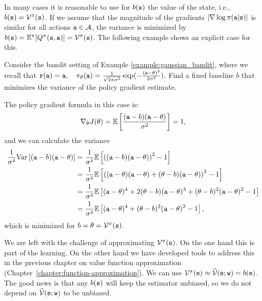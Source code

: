 In many cases it is reasonable to use for $b({\tt s})$ the value of the state,
i.e., $b({\tt s})=\mathcal{V}^\pi({\tt s})$. If we assume that the
magnitude of the gradients $|\nabla
\log \pi({\tt a}|{\tt s})|$ is similar for all actions
${\tt a}\in \mathcal{A}$, the variance is minimized 
by
$b({\tt s})=\mathbb{E}^\pi[Q^\pi({\tt s},{\tt a})]=\mathcal{V}^\pi({\tt s})$.
The following example shows an explicit case for this.
\begin{example}
    Consider the bandit setting of Example \ref{example:gaussian_bandit}, where we recall that
$        {\tt r}({\tt a}) = {\tt a}, \quad
        \pi_\theta({\tt a}) = \frac{1}{\sqrt{2 \pi \sigma^2}} \exp (- \frac{({\tt a} - \theta)^2}{2 \sigma^2}).$
Find a fixed baseline $b$ that minimizes the variance of the policy gradient estimate.

The policy gradient formula in this case is:
\begin{equation*}
        \nabla_\theta J(\theta) = \mathbb{E} \left[\frac{({\tt a}-b)({\tt a} - \theta)}{\sigma^2}\right] = 1, 
\end{equation*}
and we can calculate the variance
\begin{equation*}
\begin{split}
        \frac{1}{\sigma^4}\textrm{Var}\left[({\tt a}-b)({\tt a} - \theta)\right]  
        &=\frac{1}{\sigma^4}\mathbb{E}\left[\left(({\tt a}-b)({\tt a} - \theta)\right)^2 - 1\right] \\
        &=\frac{1}{\sigma^4}\mathbb{E}\left[\left(({\tt a}-\theta)({\tt a} - \theta) + (\theta-b)({\tt a} - \theta)\right)^2 - 1\right] \\
        &=\frac{1}{\sigma^4}\mathbb{E}\left[({\tt a}-\theta)^4 + 2(\theta-b)({\tt a} - \theta)^3 + (\theta-b)^2({\tt a} - \theta)^2 - 1\right] \\
        &=\frac{1}{\sigma^4}\mathbb{E}\left[({\tt a}-\theta)^4 + (\theta-b)^2({\tt a} - \theta)^2 - 1\right],
\end{split}
\end{equation*}
which is minimized for $b=\theta = \mathcal{V}^{\pi}({\tt s})$.
\end{example}

We are left with the challenge of approximating
$\mathcal{V}^\pi({\tt s})$. On the one hand this is part of the
learning. On the other hand we have developed tools to address this
in the previous chapter on value function approximation (Chapter~\ref{chapter:function-approximation}). We can use
$\mathcal{V}^\pi({\tt s})\approx \widehat{\mathcal{V}}({\tt s};{\tt w})=b({\tt s})$. The
good news is that any $b({\tt s})$ will keep the estimator unbiased,
so we do not depend on $\widehat{\mathcal{V}}({\tt s};{\tt w})$ to be unbiased.


